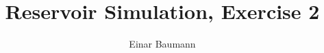 





\title{Reservoir Simulation, Exercise 2}
\author{Einar Baumann}
\maketitle
\thispagestyle{empty}
\pagebreak


